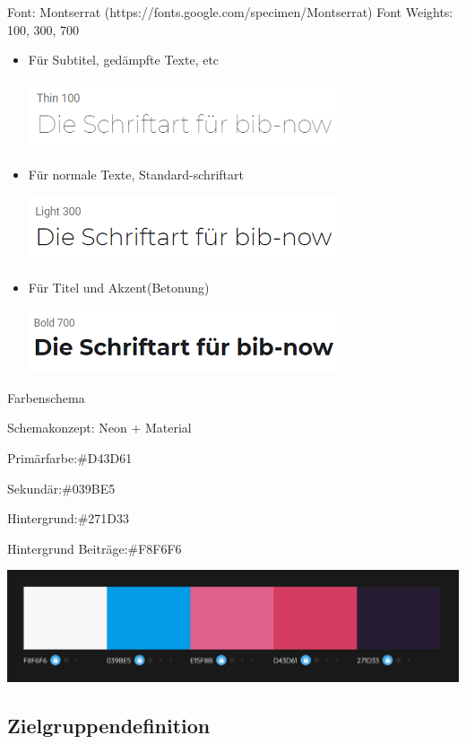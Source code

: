 \documentclass[12pt,titlepage]{article}
\begin{document}
Font: Montserrat (https://fonts.google.com/specimen/Montserrat)
Font Weights: 100, 300, 700
\vspace{2cm}
\begin{itemize}
\item
	Für Subtitel, gedämpfte Texte, etc

\includegraphics{images/Schriftart_100.png}
\item
	Für normale Texte, Standard-schriftart

\includegraphics{images/Schriftart_300.png}
\item
	Für Titel und Akzent(Betonung)

\includegraphics{images/Schriftart_700.png}
\end{itemize}


Farbenschema

Schemakonzept: Neon + Material

Primärfarbe:\#D43D61

Sekundär:\#039BE5

Hintergrund:\#271D33

Hintergrund Beiträge:\#F8F6F6

\includegraphics[width=400pt]{images/Schema_1.png}

\subsection{Zielgruppendefinition}
\end{document}
